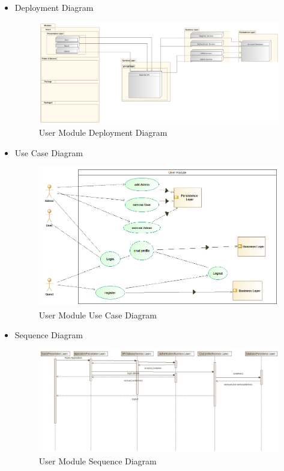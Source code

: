 \documentclass{article}
\begin{document}
\begin{itemize}
	 			\item Deployment Diagram				
	 			\begin{center}
	 				\begin{figure}[!h]
	 					\includegraphics[scale=0.3]{dd.png}
	 					\caption{User Module Deployment Diagram}
	 				\end{figure}
	 			\end{center}
	 			
	 			\item Use Case Diagram
	 			\begin{center}
	 				\begin{figure}[!h]
	 					\includegraphics[scale=0.5]{uuc.png}
	 					\caption{User Module Use Case Diagram}
	 				\end{figure}
	 			\end{center}
	 			\pagebreak
	 			
				\item Sequence Diagram				
 				\begin{center}
 					\begin{figure}[!h]
 						\includegraphics[scale=0.4]{isdu.png}
 						\caption{User Module Sequence Diagram}
 					\end{figure}
 				\end{center}
 				

\end{itemize}
\end{document}
